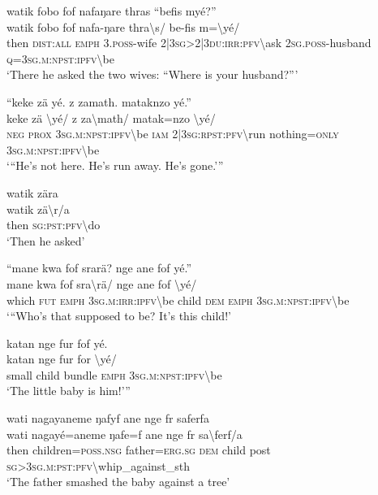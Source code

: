\ea\label{ex:9:a2337}
watik fobo fof nafaŋare thras ``befis myé?''\\
\gll watik	fobo	fof	nafa-ŋare	thra{\textbackslash}s/	be-fis	m={\textbackslash}yé/\\
     then	\textsc{dist}:\textsc{all}	\textsc{emph}	3.\textsc{poss}-wife	2|3\textsc{sg}>2|3\textsc{du}:\textsc{irr}:\textsc{pfv}{\textbackslash}ask	2\textsc{sg}.\textsc{poss}-husband	\textsc{q}=3\textsc{sg}.\textsc{m}:\textsc{npst}:\textsc{ipfv}{\textbackslash}be\\
\glt `There he asked the two wives: ``Where is your husband?'''
\z

\ea\label{ex:9:a2340}
``keke zä yé. z zamath. mataknzo yé.''\\
\gll keke	zä	{\textbackslash}yé/	z	za{\textbackslash}math/	matak=nzo	{\textbackslash}yé/\\
     \textsc{neg}	\textsc{prox}	3\textsc{sg}.\textsc{m}:\textsc{npst}:\textsc{ipfv}{\textbackslash}be	\textsc{iam}	2|3\textsc{sg}:\textsc{rpst}:\textsc{pfv}{\textbackslash}run	nothing=\textsc{only}	3\textsc{sg}.\textsc{m}:\textsc{npst}:\textsc{ipfv}{\textbackslash}be\\
\glt `{``}He's not here. He's run away. He's gone.'''
\z

\ea\label{ex:9:a4927}
watik zära\\
\gll watik	zä{\textbackslash}r/a\\
     then	\textsc{sg}:\textsc{pst}:\textsc{pfv}{\textbackslash}do\\
\glt `Then he asked'
\z

\ea\label{ex:9:a2342}
``mane kwa fof srarä? nge ane fof yé.''\\
\gll mane	kwa	fof	sra{\textbackslash}rä/	nge	ane	fof	{\textbackslash}yé/\\
     which	\textsc{fut}	\textsc{emph}	3\textsc{sg}.\textsc{m}:\textsc{irr}:\textsc{ipfv}{\textbackslash}be	child	\textsc{dem}	\textsc{emph}	3\textsc{sg}.\textsc{m}:\textsc{npst}:\textsc{ipfv}{\textbackslash}be\\
\glt `{``}Who's that supposed to be? It's this child!'
\z

\ea\label{ex:9:a4928}
katan nge fur fof yé.\\
\gll katan	nge	fur	for	{\textbackslash}yé/\\
     small	child	bundle	\textsc{emph}	3\textsc{sg}.\textsc{m}:\textsc{npst}:\textsc{ipfv}{\textbackslash}be\\
\glt `The little baby is him!'''
\z

\ea\label{ex:9:a2343}
wati nagayaneme ŋafyf ane nge fr saferfa\\
\gll wati	nagayé=aneme	ŋafe=f	ane	nge	fr	sa{\textbackslash}ferf/a\\
     then	children=\textsc{poss}.\textsc{nsg}	father=\textsc{erg}.\textsc{sg}	\textsc{dem}	child	post	\textsc{sg}>3\textsc{sg}.\textsc{m}:\textsc{pst}:\textsc{pfv}{\textbackslash}whip\_against\_sth\\
\glt `The father smashed the baby against a tree'
\z

